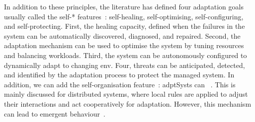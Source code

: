 In addition to these principles, the literature has defined four adaptation goals usually called the self-* features~\cite{computing2006architectural}: self-healing, self-optimising, self-configuring, and self-protecting.
First, the healing capacity, defined when the failures in the system can be automatically discovered, diagnosed, and repaired.
Second, the adaptation mechanism can be used to optimise the system by tuning resources and balancing workloads.
Third, the system can be autonomously configured to dynamically adapt to changing \gls{env}.
Four, threats can be anticipated, detected, and identified by the adaptation process to protect the managed system.
In addition, we can add the self-organisation feature~\cite{dempster1998self}: \glspl{adptSyst} can ~\cite{DBLP:conf/atal/WolfH04}.
This is mainly discussed for distributed systems, where local rules are applied to adjust their interactions and act cooperatively for adaptation.
However, this mechanism can lead to emergent behaviour~\cite{DBLP:conf/atal/WolfH04}.

